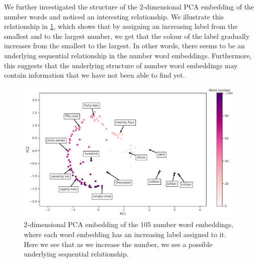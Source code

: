 We further investigated the structure of the 2-dimensional PCA embedding of the number words and noticed an interesting relationship. We illustrate this relationship in \cref{fig:ordered-number-word-embeddings-2d-pca}, which shows that by assigning an increasing label from the smallest and to the largest number, we get that the colour of the label gradually increases from the smallest to the largest. In other words, there seems to be an underlying sequential relationship in the number word embeddings. Furthermore, this suggests that the underlying structure of number word embeddings may contain information that we have not been able to find yet.
\begin{figure}[H]
    \centering
    \includegraphics[width=\textwidth]{thesis/figures/ordered-number-word-embeddings-2d-pca.pdf}
    \caption{2-dimensional PCA embedding of the 105 number word embeddings, where each word embedding has an increasing label assigned to it. Here we see that as we increase the number, we see a possible underlying sequential relationship.}
    \label{fig:ordered-number-word-embeddings-2d-pca}
\end{figure}